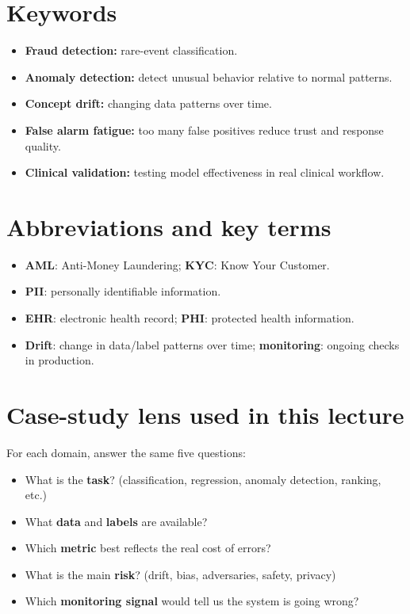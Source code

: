\documentclass[11pt]{article}
\begin{document}
\section{Keywords}
\begin{itemize}[leftmargin=*]
  \item \textbf{Fraud detection:} rare-event classification.
  \item \textbf{Anomaly detection:} detect unusual behavior relative to normal patterns.
  \item \textbf{Concept drift:} changing data patterns over time.
  \item \textbf{False alarm fatigue:} too many false positives reduce trust and response quality.
  \item \textbf{Clinical validation:} testing model effectiveness in real clinical workflow.
\end{itemize}

\section{Abbreviations and key terms}
\begin{itemize}[leftmargin=*]
  \item \textbf{AML}: Anti-Money Laundering; \textbf{KYC}: Know Your Customer.
  \item \textbf{PII}: personally identifiable information.
  \item \textbf{EHR}: electronic health record; \textbf{PHI}: protected health information.
  \item \textbf{Drift}: change in data/label patterns over time; \textbf{monitoring}: ongoing checks in production.
\end{itemize}

\section{Case-study lens used in this lecture}
For each domain, answer the same five questions:
\begin{itemize}[leftmargin=*]
  \item What is the \textbf{task}? (classification, regression, anomaly detection, ranking, etc.)
  \item What \textbf{data} and \textbf{labels} are available?
  \item Which \textbf{metric} best reflects the real cost of errors?
  \item What is the main \textbf{risk}? (drift, bias, adversaries, safety, privacy)
  \item Which \textbf{monitoring signal} would tell us the system is going wrong?
\end{itemize}
\end{document}
